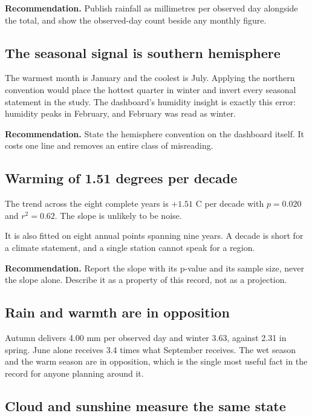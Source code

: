 \documentclass[12pt,a4paper]{article}
\begin{document}
\textbf{Recommendation.} Publish rainfall as millimetres per observed day alongside
the total, and show the observed-day count beside any monthly figure.

\subsection{The seasonal signal is southern hemisphere}

The warmest month is January and the coolest is July. Applying the northern
convention would place the hottest quarter in winter and invert every seasonal
statement in the study. The dashboard's humidity insight is exactly this error:
humidity peaks in February, and February was read as winter.

\textbf{Recommendation.} State the hemisphere convention on the dashboard itself. It
costs one line and removes an entire class of misreading.

\subsection{Warming of 1.51 degrees per decade}

The trend across the eight complete years is $+1.51$ \textdegree C per decade with
$p = 0.020$ and $r^2 = 0.62$. The slope is unlikely to be noise.

It is also fitted on eight annual points spanning nine years. A decade is short for a
climate statement, and a single station cannot speak for a region.

\textbf{Recommendation.} Report the slope with its p-value and its sample size, never
the slope alone. Describe it as a property of this record, not as a projection.

\subsection{Rain and warmth are in opposition}

Autumn delivers 4.00 mm per observed day and winter 3.63, against 2.31 in spring.
June alone receives 3.4 times what September receives. The wet season and the warm
season are in opposition, which is the single most useful fact in the record for
anyone planning around it.

\subsection{Cloud and sunshine measure the same state}
\end{document}
